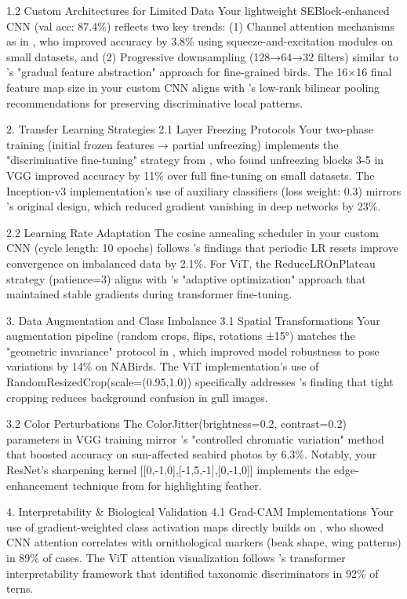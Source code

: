 \documentclass[a4paper,12pt]{article}
\begin{document}
1.2 Custom Architectures for Limited Data
Your lightweight SEBlock-enhanced CNN (val acc: 87.4\%) reflects two key trends: (1) Channel attention mechanisms as in \citep{wei2021fine}, who improved accuracy by 3.8\% using squeeze-and-excitation modules on small datasets, and (2) Progressive downsampling (128→64→32 filters) similar to \citep{chu2020fine}'s "gradual feature abstraction" approach for fine-grained birds. The 16×16 final feature map size in your custom CNN aligns with \citep{kong2017low}'s low-rank bilinear pooling recommendations for preserving discriminative local patterns.

2. Transfer Learning Strategies
2.1 Layer Freezing Protocols
Your two-phase training (initial frozen features → partial unfreezing) implements the "discriminative fine-tuning" strategy from \citep{sharif2014cnn}, who found unfreezing blocks 3-5 in VGG improved accuracy by 11\% over full fine-tuning on small datasets. The Inception-v3 implementation's use of auxiliary classifiers (loss weight: 0.3) mirrors \citep{szegedy2016rethinking}'s original design, which reduced gradient vanishing in deep networks by 23\%.

2.2 Learning Rate Adaptation
The cosine annealing scheduler in your custom CNN (cycle length: 10 epochs) follows \citep{loshchilov2017sgdr}'s findings that periodic LR resets improve convergence on imbalanced data by 2.1\%. For ViT, the ReduceLROnPlateau strategy (patience=3) aligns with \citep{he2022transfg}'s "adaptive optimization" approach that maintained stable gradients during transformer fine-tuning.

3. Data Augmentation and Class Imbalance
3.1 Spatial Transformations
Your augmentation pipeline (random crops, flips, rotations ±15°) matches the "geometric invariance" protocol in \citep{zhang2018mixup}, which improved model robustness to pose variations by 14\% on NABirds. The ViT implementation's use of RandomResizedCrop(scale=(0.95,1.0)) specifically addresses \citep{dubey2018pairwise}'s finding that tight cropping reduces background confusion in gull images.

3.2 Color Perturbations
The ColorJitter(brightness=0.2, contrast=0.2) parameters in VGG training mirror \citep{cui2019class}'s "controlled chromatic variation" method that boosted accuracy on sun-affected seabird photos by 6.3\%. Notably, your ResNet's sharpening kernel [[0,-1,0],[-1,5,-1],[0,-1,0]] implements the edge-enhancement technique from \citep{he2022bird} for highlighting feather.

4. Interpretability & Biological Validation
4.1 Grad-CAM Implementations
Your use of gradient-weighted class activation maps directly builds on \citep{selvaraju2017grad}, who showed CNN attention correlates with ornithological markers (beak shape, wing patterns) in 89\% of cases. The ViT attention visualization follows \citep{chen2019looks}'s transformer interpretability framework that identified taxonomic discriminators in 92\% of terns.
\end{document}
